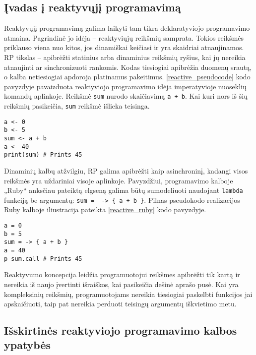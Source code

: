 \subsection{Įvadas į reaktyvųjį programavimą}

Reaktyvųjį programavimą galima laikyti tam tikra deklaratyviojo programavimo atmaina. Pagrindinė jo idėja – reaktyviųjų reikšmių samprata. Tokios reikšmės priklauso viena nuo kitos, jos dinamiškai keičiasi ir yra skaidriai atnaujinamos. RP tikslas – apibrėžti statinius arba dinaminius reikšmių ryšius, kai jų nereikia atnaujinti ar sinchronizuoti rankomis. Kodas tiesiogiai apibrėžia duomenų srautą, o kalba netiesiogiai apdoroja platinamus pakeitimus. \ref{reactive_pseudocode} kodo pavyzdyje pavaizduota reaktyviojo programavimo idėja imperatyvioje nuoseklių komandų aplinkoje. Reikšmė \lstinline|sum| nurodo skaičiavimą \lstinline|a + b|. Kai kuri nors iš šių reikšmių pasikeičia, \lstinline|sum| reikšmė išlieka teisinga.

\begin{lstlisting}[caption=Reaktyvaus programavimo pseudokodas, label=reactive_pseudocode]
a <- 0
b <- 5
sum <- a + b
a <- 40
print(sum) # Prints 45
\end{lstlisting}

Dinaminių kalbų atžvilgiu, RP galima apibrėžti kaip asinchroninį, kadangi visos reikšmės yra uždariniai visoje aplinkoje. Pavyzdžiui, programavimo kalboje „Ruby“ anksčiau pateiktą elgseną galima būtų sumodeliuoti naudojant \lstinline|lambda| funkciją be argumentų: \lstinline|sum =  -> { a + b }|. Pilnas pseudokodo realizacijos Ruby kalboje iliustracija pateikta \ref{reactive_ruby} kodo pavyzdyje.

\begin{lstlisting}[caption=Reaktyvaus programavimo pavyzdys Ruby kalboje, label=reactive_ruby]
a = 0
b = 5
sum = -> { a + b }
a = 40
p sum.call # Prints 45
\end{lstlisting}

Reaktyvumo koncepcija leidžia programuotojui reikšmes apibrėžti tik kartą ir nereikia iš naujo įvertinti išraiškos, kai pasikeičia dešinė aprašo pusė. Kai yra kompleksinių reikšmių, programuotojams nereikia tiesiogiai paskelbti funkcijos jai apskaičiuoti, taip pat nereikia perduoti teisingų argumentų iškvietimo metu.

\subsection{Išskirtinės reaktyviojo programavimo kalbos ypatybės}

